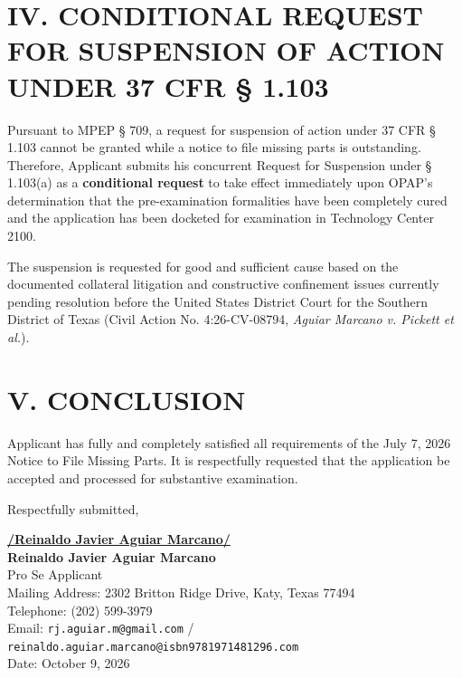\documentclass[11pt,letterpaper]{article}
\begin{document}
\section*{IV. CONDITIONAL REQUEST FOR SUSPENSION OF ACTION UNDER 37 CFR \S{} 1.103}

Pursuant to MPEP \S{} 709, a request for suspension of action under 37 CFR \S{} 1.103 cannot be granted while a notice to file missing parts is outstanding. Therefore, Applicant submits his concurrent Request for Suspension under \S{} 1.103(a) as a \textbf{conditional request} to take effect immediately upon OPAP's determination that the pre-examination formalities have been completely cured and the application has been docketed for examination in Technology Center 2100.

The suspension is requested for good and sufficient cause based on the documented collateral litigation and constructive confinement issues currently pending resolution before the United States District Court for the Southern District of Texas (Civil Action No. 4:26-CV-08794, \textit{Aguiar Marcano v. Pickett et al.}).

\section*{V. CONCLUSION}

Applicant has fully and completely satisfied all requirements of the July 7, 2026 Notice to File Missing Parts. It is respectfully requested that the application be accepted and processed for substantive examination.

\vspace{0.8cm}
\begin{singlespace}
\noindent Respectfully submitted, \par\vspace{1.5cm}
\underline{\textbf{/Reinaldo Javier Aguiar Marcano/}} \\
\textbf{Reinaldo Javier Aguiar Marcano} \\
Pro Se Applicant \\
Mailing Address: 2302 Britton Ridge Drive, Katy, Texas 77494 \\
Telephone: (202) 599-3979 \\
Email: \texttt{rj.aguiar.m@gmail.com} / \texttt{reinaldo.aguiar.marcano@isbn9781971481296.com} \\
Date: October 9, 2026
\end{singlespace}
\end{document}
